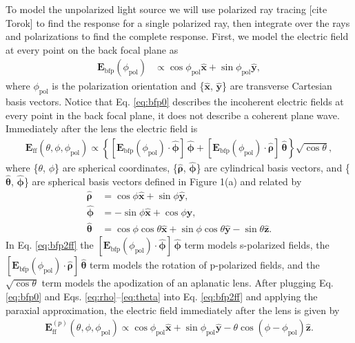 \documentclass{osa-article}
\providecommand{\mb}[1]{\mathbf{#1}}
\providecommand{\mh}[1]{\mathbf{\hat{#1}}}
\providecommand{\bsh}[1]{\hat{\boldsymbol{#1}}}
\begin{document}
To model the unpolarized light source we will use polarized ray tracing [cite
Torok] to find the response for a single polarized ray, then integrate over the
rays and polarizations to find the complete response. First, we model the
electric field at every point on the back focal plane as
\begin{align}
   \mb{E}_{\text{bfp}}(\phi_{\text{pol}}) &\propto \cos\phi_{\text{pol}}\mh{x} + \sin\phi_{\text{pol}}\mh{y}, \label{eq:bfp0}
\end{align}
where $\phi_{\text{pol}}$ is the polarization orientation and \{$\mh{x}$,
$\mh{y}$\} are transverse Cartesian basis vectors. Notice that Eq. \ref{eq:bfp0}
describes the incoherent electric fields at every point in the back focal plane,
it does not describe a coherent plane wave. Immediately after the lens the
electric field is
\begin{align}
  \mb{E}_{\text{ff}}(\theta, \phi, \phi_{\text{pol}}) \propto \left\{[\mb{E}_\text{bfp}(\phi_{\text{pol}})\cdot\bsh{\phi}]\,\bsh{\phi} + [\mb{E}_\text{bfp}(\phi_{\text{pol}})\cdot\bsh{\rho}]\,\bsh{\theta}\right\}\sqrt{\cos\theta}, \label{eq:bfp2ff}
\end{align}
where \{$\theta$, $\phi$\} are spherical coordinates, \{$\bsh{\rho}$,
$\bsh{\phi}$\} are cylindrical basis vectors, and \{$\bsh{\theta}$,
$\bsh{\phi}$\} are spherical basis vectors defined in Figure 1(a) and related by
\begin{align}
  \bsh{\rho} &= \cos\phi\mh{x} + \sin\phi\mh{y},\label{eq:rho}\\
  \bsh{\phi} &= -\sin\phi\mh{x} + \cos\phi\mh{y},\label{eq:phi}\\
  \bsh{\theta} &= \cos\phi\cos\theta\mh{x} + \sin\phi\cos\theta\mh{y} - \sin\theta\mh{z}.\label{eq:theta}               
\end{align}
In Eq. \ref{eq:bfp2ff} the
$[\mb{E}_\text{bfp}(\phi_{\text{pol}})\cdot\bsh{\phi}]\,\bsh{\phi}$ term models
s-polarized fields, the
$[\mb{E}_\text{bfp}(\phi_{\text{pol}})\cdot\bsh{\rho}]\,\bsh{\theta}$ term
models the rotation of p-polarized fields, and the $\sqrt{\cos\theta}$ term
models the apodization of an aplanatic lens. After plugging Eq. \ref{eq:bfp0}
and Eqs. \ref{eq:rho}--\ref{eq:theta} into Eq. \ref{eq:bfp2ff} and applying the
paraxial approximation, the electric field immediately after the lens is given
by
\begin{align}
  \mb{E}_{\text{ff}}^{(p)}(\theta, \phi, \phi_{\text{pol}}) \propto \cos\phi_{\text{pol}}\mh{x} + \sin\phi_{\text{pol}}\mh{y} - \theta\cos(\phi - \phi_{\text{pol}})\mh{z}.\label{eq:eff}
\end{align}
\end{document}
